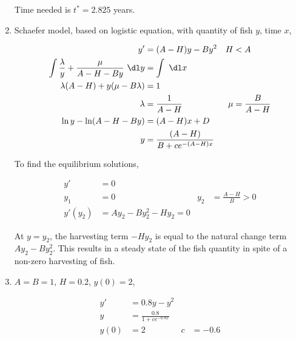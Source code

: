 \begin{enumerate}
          Time needed is $ t^{*} = 2.825 $ years.

    \item Schaefer model, based on logistic equation, with quantity of fish $ y $,
          time $ x $,

          \begin{align}
              y'                                                  & = (A-H)y - By^{2}                & H   & < A             \\
              \int \frac{\lambda}{y} + \frac{\mu}{A-H -By}\ \dl y & = \int\ \dl x                                            \\
              \lambda(A-H) + y(\mu - B\lambda)                    & = 1                                                      \\
              \lambda                                             & = \frac{1}{A-H}                  & \mu & = \frac{B}{A-H} \\
              \ln y - \ln (A-H - By)                              & = (A-H)x + D                                             \\
              y                                                   & = \frac{(A-H)}{B + ce^{-(A-H)x}}
          \end{align}

          To find the equilibrium solutions,

          \begin{align}
              y'        & = 0                                                              \\
              y_{1}     & = 0                                & y_{2} & = \frac{A-H}{B} > 0 \\
              y'(y_{2}) & = Ay_{2} - By_{2}^{2} - Hy_{2} = 0
          \end{align}

          At $ y = y_{2} $, the harvesting term $ -Hy_{2} $ is equal to the natural change
          term $ Ay_{2} - By_{2}^{2} $. This results in a steady state of the fish quantity
          in spite of a non-zero harvesting of fish.

    \item $ A = B = 1 $, $ H = 0.2 $, $ y(0) = 2 $,

          \begin{align}
              y'   & = 0.8y - y^{2}                            \\
              y    & = \frac{0.8}{1 + ce^{-0.8x}}              \\
              y(0) & = 2                          & c & = -0.6
          \end{align}


\end{enumerate}
